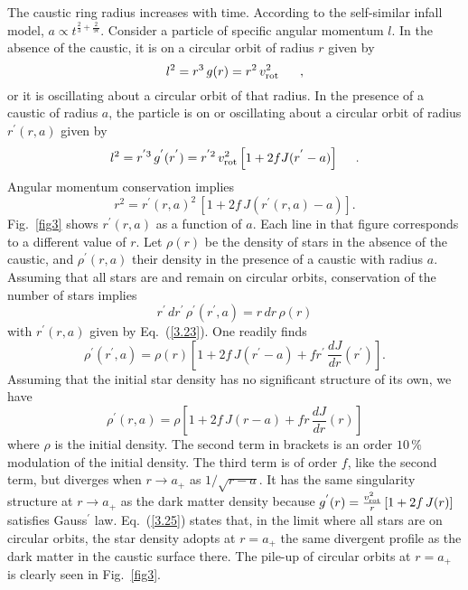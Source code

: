 \documentclass[aps,prd,preprint,tightenlines,floatfix,showpacs,groupedaddress]{revtex4}
\begin{document}
{The caustic ring radius increases with time. According to 
the self-similar infall model, $a \propto t^{\frac{2}{3} +
\frac{2}{9\epsilon}}$.  Consider a particle of specific 
angular momentum $l$. In the absence of the caustic, it is 
on a circular orbit of radius $r$ given by
\begin{equation}
l^2 = r^3\,g(r) = r^2 \, v^2_{\rm rot}~~~~\ ,
\label{eqfr}
\end{equation}
or it is oscillating about a circular orbit of that radius. In 
the presence of a caustic of radius $a$, the particle is on 
or oscillating about a circular orbit of radius $r^{'}(r,a)$ 
given by 
\begin{equation}
l^2 = r^{'3}\,g^{'}(r^{'}) 
= r^{'2} \, v^2_{\rm rot} \left[1 + 2 f J(r^{'}-a) \right]~~~\ .
\end{equation}
Angular momentum conservation implies 
\begin{equation}
r^2 = r^{'}(r,a)^2 \, \left[1 + 2 f\, J(r^{'}(r,a) - a) \right]. 
\label{3.23}
\end{equation}
Fig.~\ref{fig3} shows $r^{'}(r,a)$ as a function of $a$. Each 
line in that figure corresponds to a different value of $r$. Let 
$\rho(r)$ be the density of stars in the absence of the caustic, 
and $\rho^{'}(r,a)$ their density in the presence of a caustic 
with radius $a$. Assuming that all stars are and remain on 
circular orbits, conservation of the number of stars implies
\begin{equation}
r^{'}\,dr^{'}\,\rho^{'}(r^{'},a) = r\,dr\,\rho(r)
\end{equation}
with $r^{'}(r,a)$ given by Eq.~(\ref{3.23}). One readily finds
\begin{equation}
\rho^{'}(r^{'},a) = \rho(r) \left[1 + 2 f\,J(r^{'}-a) + 
f r^{'}\,\frac{dJ}{dr}(r^{'}) \right]. 
\label{3.24}
\end{equation}
Assuming that the initial star density has no significant structure 
of its own, we have
\begin{equation}
\rho^{'}(r,a) = \rho \left[1 + 2 f\,J(r-a) + f r\,\frac{dJ}{dr}(r) \right]
\label{3.25}
\end{equation}
where $\rho$ is the initial density. The second term in brackets 
is an order $10\,\%$ modulation of the initial density. The third 
term is of order $f$, like the second term, but diverges when 
$r \rightarrow a_+$ as $1/\sqrt{r-a}$. It has the same singularity 
structure at $r \rightarrow a_+$ as the dark matter density because 
$g^{'}(r) = \frac{v^2_{\rm rot}}{r} \left[1 + 2 f\,J(r) \right]$
satisfies Gauss$^{'}$ law. Eq.~(\ref{3.25}) states that, in the 
limit where all stars are on circular orbits, the star density
adopts at $r=a_+$ the same divergent profile as the dark matter 
in the caustic surface there.  The pile-up of circular orbits
at $r = a_+$ is clearly seen in Fig.~\ref{fig3}.

}
\end{document}

